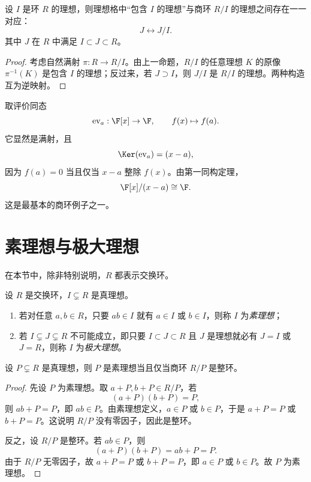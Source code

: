\begin{corollary}
设 $I$ 是环 $R$ 的理想，则理想格中“包含 $I$ 的理想”与商环 $R/I$ 的理想之间存在一一对应：
\[
J\longleftrightarrow J/I.
\]
其中 $J$ 在 $R$ 中满足 $I\subset J\subset R$。
\end{corollary}

\begin{proof}
考虑自然满射 $\pi:R\to R/I$。由上一命题，$R/I$ 的任意理想 $K$ 的原像 $\pi^{-1}(K)$ 是包含 $I$ 的理想；反过来，若 $J\supset I$，则 $J/I$ 是 $R/I$ 的理想。两种构造互为逆映射。
\end{proof}

\begin{example}
取评价同态
\[
\operatorname{ev}_a:\F[x]\to \F,
\qquad f(x)\mapsto f(a).
\]
它显然是满射，且
\[
\Ker(\operatorname{ev}_a)=(x-a),
\]
因为 $f(a)=0$ 当且仅当 $x-a$ 整除 $f(x)$。由第一同构定理，
\[
\F[x]/(x-a)\cong \F.
\]
这是最基本的商环例子之一。
\end{example}

\section{素理想与极大理想}

在本节中，除非特别说明，$R$ 都表示交换环。

\begin{definition}
设 $R$ 是交换环，$I\subsetneq R$ 是真理想。
\begin{enumerate}[label=\textnormal{(\arabic*)}]
  \item 若对任意 $a,b\in R$，只要 $ab\in I$ 就有 $a\in I$ 或 $b\in I$，则称 $I$ 为\emph{素理想}；
  \item 若 $I\subsetneq J\subsetneq R$ 不可能成立，即只要 $I\subset J\subset R$ 且 $J$ 是理想就必有 $J=I$ 或 $J=R$，则称 $I$ 为\emph{极大理想}。
\end{enumerate}
\end{definition}

\begin{theorem}
设 $P\subsetneq R$ 是真理想，则 $P$ 是素理想当且仅当商环 $R/P$ 是整环。
\end{theorem}

\begin{proof}
先设 $P$ 为素理想。取 $a+P,b+P\in R/P$，若
\[
(a+P)(b+P)=P,
\]
则 $ab+P=P$，即 $ab\in P$。由素理想定义，$a\in P$ 或 $b\in P$，于是 $a+P=P$ 或 $b+P=P$。这说明 $R/P$ 没有零因子，因此是整环。

反之，设 $R/P$ 是整环。若 $ab\in P$，则
\[
(a+P)(b+P)=ab+P=P.
\]
由于 $R/P$ 无零因子，故 $a+P=P$ 或 $b+P=P$，即 $a\in P$ 或 $b\in P$。故 $P$ 为素理想。
\end{proof}

